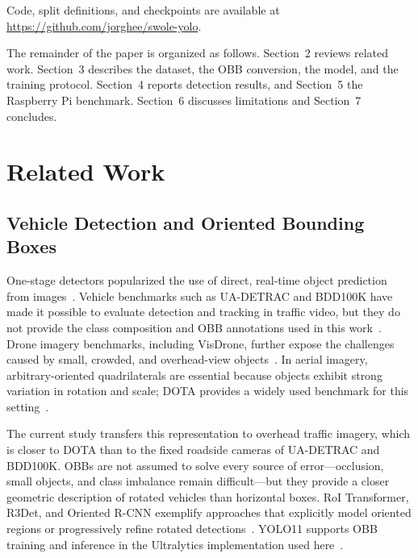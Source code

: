 \documentclass[runningheads]{llncs}
\begin{document}
Code, split definitions, and checkpoints are available at
\url{https://github.com/jorghee/swole-yolo}.

The remainder of the paper is organized as follows. Section~2 reviews related
work. Section~3 describes the dataset, the OBB conversion, the model, and the
training protocol. Section~4 reports detection results, and Section~5 the
Raspberry Pi benchmark. Section~6 discusses limitations and Section~7
concludes.

\section{Related Work}

\subsection{Vehicle Detection and Oriented Bounding Boxes}

One-stage detectors popularized the use of direct, real-time object prediction
from images~\cite{redmon2016yolo}. Vehicle benchmarks such as UA-DETRAC and
BDD100K have made it possible to evaluate detection and tracking in traffic
video, but they do not provide the class composition and OBB annotations used
in this work~\cite{wen2015uadetrac,yu2020bdd100k}. Drone imagery benchmarks,
including VisDrone, further expose the challenges caused by small, crowded, and
overhead-view objects~\cite{zhu2018visdrone}. In aerial imagery,
arbitrary-oriented quadrilaterals are essential because objects exhibit strong
variation in rotation and scale; DOTA provides a widely used benchmark for this
setting~\cite{xia2018dota}.

The current study transfers this representation to overhead traffic imagery,
which is closer to DOTA than to the fixed roadside cameras of UA-DETRAC and
BDD100K. OBBs are not assumed to solve every source of error---occlusion, small
objects, and class imbalance remain difficult---but they provide a closer
geometric description of rotated vehicles than horizontal boxes. RoI
Transformer, R3Det, and Oriented R-CNN exemplify approaches that explicitly
model oriented regions or progressively refine rotated
detections~\cite{ding2019roitransformer,yang2021r3det,xie2021orientedrcnn}.
YOLO11 supports OBB training and inference in the Ultralytics implementation
used here~\cite{ultralytics_obb}.
\end{document}
